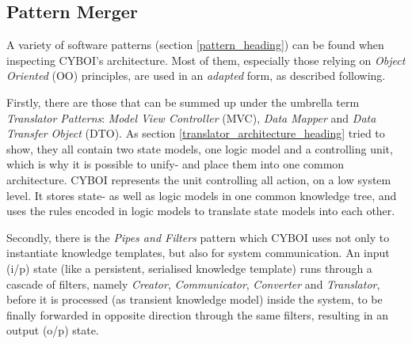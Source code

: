%
%
%
%
%
%
%

\subsection{Pattern Merger}
\label{pattern_merger_heading}

A variety of software patterns (section \ref{pattern_heading}) can be found
when inspecting CYBOI's architecture. Most of them, especially those relying on
\emph{Object Oriented} (OO) principles, are used in an \emph{adapted} form, as
described following.

Firstly, there are those that can be summed up under the umbrella term
\emph{Translator Patterns}: \emph{Model View Controller} (MVC),
\emph{Data Mapper} and \emph{Data Transfer Object} (DTO). As section
\ref{translator_architecture_heading} tried to show, they all contain two state
models, one logic model and a controlling unit, which is why it is possible to
unify- and place them into one common architecture. CYBOI represents the unit
controlling all action, on a low system level. It stores state- as well as
logic models in one common knowledge tree, and uses the rules encoded in logic
models to translate state models into each other.

Secondly, there is the \emph{Pipes and Filters} pattern which CYBOI uses not
only to instantiate knowledge templates, but also for system communication.
An input (i/p) state (like a persistent, serialised knowledge template) runs
through a cascade of filters, namely \emph{Creator}, \emph{Communicator},
\emph{Converter} and \emph{Translator}, before it is processed (as transient
knowledge model) inside the system, to be finally forwarded in opposite
direction through the same filters, resulting in an output (o/p) state.

